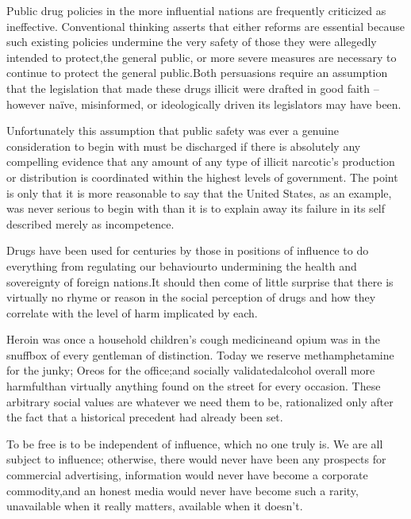 Public drug policies in the more influential nations are frequently criticized as ineffective. Conventional thinking asserts that either reforms are essential because such existing policies undermine the very safety of those they were allegedly intended to protect, the general public, or more severe measures are necessary to continue to protect the general public. Both persuasions require an assumption that the legislation that made these drugs illicit were drafted in good faith -- however naïve, misinformed, or ideologically driven its legislators may have been.

Unfortunately this assumption that public safety was ever a genuine consideration to begin with must be discharged if there is absolutely any compelling evidence that any amount of any type of illicit narcotic's production or distribution is coordinated within the highest levels of government. The point is only that it is more reasonable to say that the United States, as an example, was never serious to begin with than it is to explain away its failure in its self described  merely as incompetence. 

Drugs have been used for centuries by those in positions of influence to do everything from regulating our behaviour\footnotecite[wilson2007] to undermining the health and sovereignty of foreign nations. It should then come of little surprise that there is virtually no rhyme or reason in the social perception of drugs and how they correlate with the level of harm implicated by each.

Heroin was once a household children's cough medicine and opium was in the snuffbox of every gentleman of distinction. Today we reserve methamphetamine for the junky; Oreos for the office; and socially validated alcohol overall more harmful\footnotecite[extras={ See figure 2.}][nutt2010] than virtually anything found on the street for every occasion. These arbitrary social values are whatever we need them to be, rationalized only after the fact that a historical precedent had already been set.


To be free is to be independent of influence, which no one truly is. We are all subject to influence; otherwise, there would never have been any prospects for commercial advertising, information would never have become a corporate commodity,\footnotecite[santoso2008]\footnotecite[nagata2011] and an honest media would never have become such a rarity, unavailable when it really matters,
available when it doesn't.

